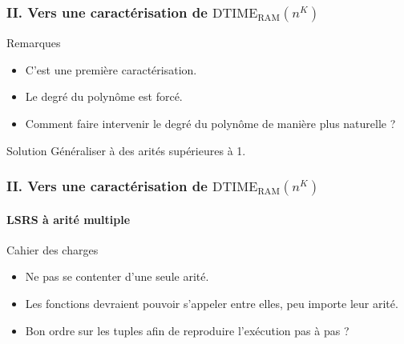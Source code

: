 \documentclass[10pt]{beamer}
\newcommand{\dtimeram}{\text{DTIME}_{\text{RAM}}\left( n^K \right)}
\begin{document}

	
	\begin{frame}
		\frametitle{II. Vers une caractérisation de $\dtimeram$}
		
		\begin{block}{Remarques}
			\begin{itemize}
				\item 	C'est une première caractérisation.
				\pause 
				\item 	Le degré du polynôme est forcé.
				\pause 
				\item 	Comment faire intervenir le degré du polynôme de manière plus naturelle ?
			\end{itemize}
		\end{block}
		
		\pause 
		
		\begin{block}{Solution}
			Généraliser à des arités supérieures à 1. 
		\end{block}
	\end{frame}
	
	
	\begin{frame}
		\frametitle{II. Vers une caractérisation de $\dtimeram$}
		\framesubtitle{LSRS à arité multiple}
		
		
		\begin{block}{Cahier des charges}
			\begin{itemize}
				\item 	Ne pas se contenter d'une seule arité. %
				\pause 
				\item 	Les fonctions devraient pouvoir s'appeler entre elles, peu importe leur arité. %
				\item 	Bon ordre sur les tuples afin de reproduire l'exécution pas à pas ?
			\end{itemize}
		\end{block}
		
	\end{frame}
	
\end{document}
